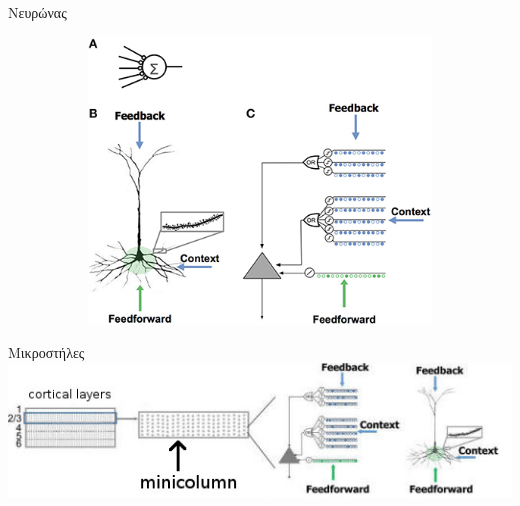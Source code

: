 \documentclass[10pt,lualatex]{beamer}
\title{\huge{\titlestring}}
\author{\authorstring\\
Επιβλέπων καθηγητής: Νίκος Πιτσιάνης}
\date{13 Ιουνίου 2019}
\begin{document}
\begin{frame}%
  \titlepage
\end{frame}

\begin{frame}{Νευρώνας}
  \centering
	\begin{figure}[h]
		\begin{subfigure}{0.30\textwidth}
			
		\end{subfigure}
		\hfill
		\begin{subfigure}{0.65\textwidth}
			\includegraphics[width=\textwidth]{../figures/numenta_neuron}
		\end{subfigure}
	\end{figure}
\end{frame}

\begin{frame}{Μικροστήλες}
  \centering
  \includegraphics[width=\textwidth]{../figures/layer-minicolumn}
\end{frame}
\end{document}
